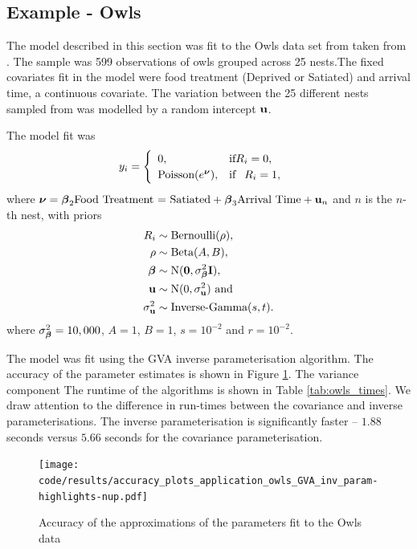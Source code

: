 \subsection{Example - Owls}
\label{sec:owls}
The model described in this section was fit to the Owls data set from taken from \cite{zuur_mixed_2009}.
The sample was 599 observations of owls grouped across 25 nests.The fixed covariates
fit in the model were food treatment (Deprived or Satiated) and arrival time, a continuous covariate.
The variation between the 25 different nests sampled from was modelled by a random intercept
${\bf u}$.

The model fit was
$$
	y_i = \begin{cases}
	\begin{array}{ll}
	0, & \text{if} R_i = 0, \\
	\text{Poisson}(e^{\boldsymbol \nu}), & \text{if} \phantom{-} R_i = 1,
	\end{array}
	\end{cases}
$$
where ${\boldsymbol \nu} = {{\boldsymbol \beta}_2 \text{Food Treatment = Satiated} + {\boldsymbol \beta}_3 \text{Arrival Time} + {\bf u}_n}$ and $n$ is the $n$-th nest, with priors
\begin{align*}
R_i &\sim \text{Bernoulli}(\rho), \\
\rho &\sim \text{Beta}(A, B), \\
{\boldsymbol \beta} &\sim \text{N}({\bf 0}, \sigma_{\boldsymbol \beta}^2 {\bf I}), \\
{\bf u} &\sim \text{N}(0, \sigma_{\bf u}^2) \text { and } \\
\sigma_{\bf u}^2 &\sim \text{Inverse-Gamma}(s, t).
\end{align*}
where $\sigma_{\boldsymbol \beta}^2=10,000$, $A=1$, $B=1$, $s=10^{-2}$ and $r=10^{-2}$.

The model was fit using the GVA inverse parameterisation algorithm. The accuracy of the parameter
estimates is shown in Figure \ref{fig:owls}. The variance component
The runtime of the algorithms is shown in Table
\ref{tab:owls_times}. We draw attention to the difference in run-times between the covariance and
inverse parameterisations. The inverse parameterisation is significantly faster -- $1.88$ seconds versus
$5.66$ seconds for the covariance parameterisation.

\begin{figure}[h]
	\texttt{[image: code/results/accuracy\_plots\_application\_owls\_GVA\_inv\_param-highlights-nup.pdf]}
	\caption{Accuracy of the approximations of the parameters fit to the Owls data}
	\label{fig:owls}
\end{figure}

